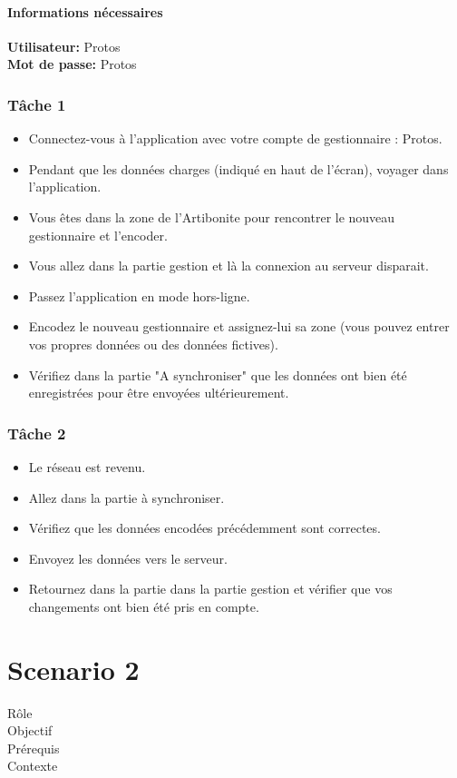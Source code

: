\documentclass{EPL-master-thesis-covers-FR}
\begin{document}
				\paragraph*{Informations nécessaires}
					\textbf{Utilisateur:} Protos \\
					\textbf{Mot de passe:} Protos 
					
				\subsubsection*{Tâche 1}
					\begin{itemize}
						\item Connectez-vous à l’application avec votre compte de gestionnaire : Protos.
						\item Pendant que les données charges (indiqué en haut de l’écran), voyager dans l’application.
						\item Vous êtes dans la zone de l’Artibonite pour rencontrer le nouveau gestionnaire et l’encoder.
						\item Vous allez dans la partie gestion et là la connexion au serveur disparait.
						\item Passez l’application en mode hors-ligne.
						\item Encodez le nouveau gestionnaire et assignez-lui sa zone (vous pouvez entrer vos propres données ou des données fictives).
						\item Vérifiez dans la partie "A synchroniser" que les données ont bien été enregistrées pour être envoyées ultérieurement.
					\end{itemize}
					
				\subsubsection*{Tâche 2}
					\begin{itemize}
						\item Le réseau est revenu.
						\item Allez dans la partie à synchroniser.
						\item Vérifiez que les données encodées précédemment sont correctes. 
						\item Envoyez les données vers le serveur. 
						\item Retournez dans la partie dans la partie gestion et vérifier que vos changements ont bien été pris en compte. 
					\end{itemize}
			
			\section{Scenario 2}
				\begin{description}
					\item[Rôle]
					\item[Objectif]
					\item[Prérequis]
					\item[Contexte]
				\end{description}
							
\end{document}
